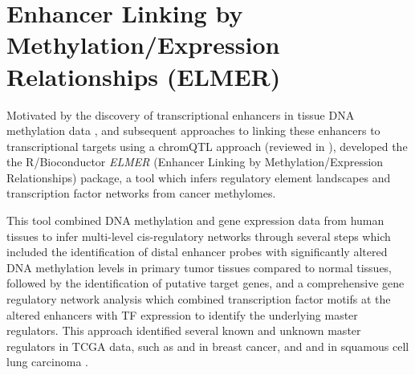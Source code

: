
\section{Enhancer Linking by Methylation/Expression Relationships (ELMER)}

Motivated by the discovery of transcriptional enhancers in tissue DNA methylation data \cite{berman2012ng}, and subsequent approaches to linking these enhancers to transcriptional targets using a chromQTL approach \cite{aran2013dna} (reviewed in ),  developed the the R/Bioconductor  \textit{ELMER} (Enhancer Linking by Methylation/Expression Relationships) package, a tool which infers regulatory element landscapes and transcription factor networks from cancer methylomes. 

This tool combined DNA methylation and gene expression data from human tissues to infer multi-level cis-regulatory networks through several steps which included the identification of distal enhancer probes with significantly altered DNA methylation levels in primary tumor tissues compared to normal tissues, followed by the identification of putative target genes, and a comprehensive gene regulatory network analysis which combined transcription factor motifs at the altered enhancers with TF expression to identify the underlying master regulators. This approach identified several known and unknown master regulators in TCGA data, such as  and  in breast cancer, and  and  in squamous cell lung carcinoma \cite{yao2015inferring,silva2016tcga}.

